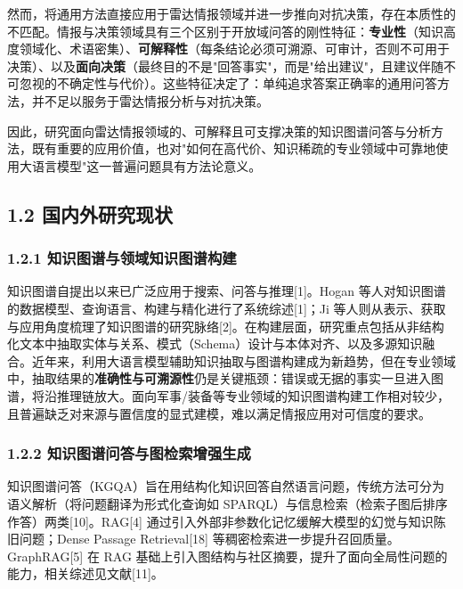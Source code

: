 \documentclass[12pt,a4paper]{ctexart}
\begin{document}
然而，将通用方法直接应用于雷达情报领域并进一步推向对抗决策，存在本质性的不匹配。情报与决策领域具有三个区别于开放域问答的刚性特征：\textbf{专业性}（知识高度领域化、术语密集）、\textbf{可解释性}（每条结论必须可溯源、可审计，否则不可用于决策）、以及\textbf{面向决策}（最终目的不是"回答事实"，而是"给出建议"，且建议伴随不可忽视的不确定性与代价）。这些特征决定了：单纯追求答案正确率的通用问答方法，并不足以服务于雷达情报分析与对抗决策。

因此，研究面向雷达情报领域的、可解释且可支撑决策的知识图谱问答与分析方法，既有重要的应用价值，也对"如何在高代价、知识稀疏的专业领域中可靠地使用大语言模型"这一普遍问题具有方法论意义。

\subsection*{1.2 国内外研究现状}

\subsubsection*{1.2.1 知识图谱与领域知识图谱构建}

知识图谱自提出以来已广泛应用于搜索、问答与推理[1]。Hogan 等人对知识图谱的数据模型、查询语言、构建与精化进行了系统综述[1]；Ji 等人则从表示、获取与应用角度梳理了知识图谱的研究脉络[2]。在构建层面，研究重点包括从非结构化文本中抽取实体与关系、模式（Schema）设计与本体对齐、以及多源知识融合。近年来，利用大语言模型辅助知识抽取与图谱构建成为新趋势，但在专业领域中，抽取结果的\textbf{准确性与可溯源性}仍是关键瓶颈：错误或无据的事实一旦进入图谱，将沿推理链放大。面向军事/装备等专业领域的知识图谱构建工作相对较少，且普遍缺乏对来源与置信度的显式建模，难以满足情报应用对可信度的要求。

\subsubsection*{1.2.2 知识图谱问答与图检索增强生成}

知识图谱问答（KGQA）旨在用结构化知识回答自然语言问题，传统方法可分为语义解析（将问题翻译为形式化查询如 SPARQL）与信息检索（检索子图后排序作答）两类[10]。RAG[4] 通过引入外部非参数化记忆缓解大模型的幻觉与知识陈旧问题；Dense Passage Retrieval[18] 等稠密检索进一步提升召回质量。GraphRAG[5] 在 RAG 基础上引入图结构与社区摘要，提升了面向全局性问题的能力，相关综述见文献[11]。
\end{document}
